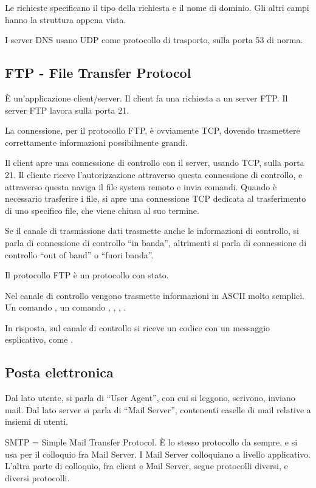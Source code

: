 Le richieste specificano il tipo della richiesta e il nome di dominio. Gli altri campi hanno la struttura appena vista.

I server DNS usano UDP come protocollo di trasporto, sulla porta 53 di norma.

\subsection{FTP - File Transfer Protocol}

\`E un'applicazione client/server. Il client fa una richiesta a un server FTP. Il server FTP lavora sulla porta 21.

La connessione, per il protocollo FTP, \`e ovviamente TCP, dovendo trasmettere correttamente informazioni possibilmente grandi.

Il client apre una connessione di controllo con il server, usando TCP, sulla porta 21. Il cliente riceve l'autorizzazione attraverso questa connessione di controllo, e attraverso questa naviga il file system remoto e invia comandi. Quando \`e necessario trasferire i file, si apre una connessione TCP dedicata al trasferimento di uno specifico file, che viene chiusa al suo termine.

Se il canale di trasmissione dati trasmette anche le informazioni di controllo, si parla di connessione di controllo ``in banda'', altrimenti si parla di connessione di controllo ``out of band'' o ``fuori banda''.

Il protocollo FTP \`e un protocollo con stato.

Nel canale di controllo vengono trasmette informazioni in ASCII molto semplici. Un comando , un comando , , , .

In risposta, sul canale di controllo si riceve un codice con un messaggio esplicativo, come .

\subsection{Posta elettronica}

Dal lato utente, si parla di ``User Agent'', con cui si leggono, scrivono, inviano mail. Dal lato server si parla di ``Mail Server'', contenenti caselle di mail relative a insiemi di utenti.

SMTP = Simple Mail Transfer Protocol. \`E lo stesso protocollo da sempre, e si usa per il colloquio fra Mail Server. I Mail Server colloquiano a livello applicativo. L'altra parte di colloquio, fra client e Mail Server, segue protocolli diversi, e diversi protocolli.

